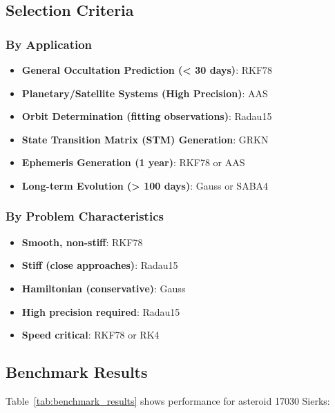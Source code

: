 \subsection{Selection Criteria}

\subsubsection{By Application}

\begin{itemize}
    \item \textbf{General Occultation Prediction (< 30 days)}: RKF78
    \item \textbf{Planetary/Satellite Systems (High Precision)}: AAS
    \item \textbf{Orbit Determination (fitting observations)}: Radau15
    \item \textbf{State Transition Matrix (STM) Generation}: GRKN
    \item \textbf{Ephemeris Generation (1 year)}: RKF78 or AAS
    \item \textbf{Long-term Evolution (> 100 days)}: Gauss or SABA4
\end{itemize}

\subsubsection{By Problem Characteristics}

\begin{itemize}
    \item \textbf{Smooth, non-stiff}: RKF78
    \item \textbf{Stiff (close approaches)}: Radau15
    \item \textbf{Hamiltonian (conservative)}: Gauss
    \item \textbf{High precision required}: Radau15
    \item \textbf{Speed critical}: RKF78 or RK4
\end{itemize}

\subsection{Benchmark Results}

Table~\ref{tab:benchmark_results} shows performance for asteroid 17030 Sierks:

